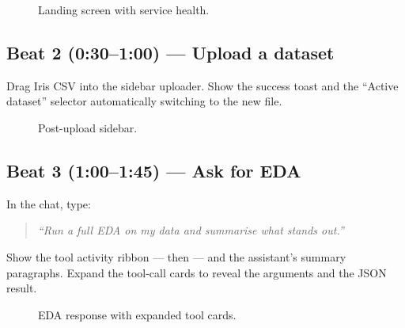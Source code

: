 \begin{figure}[H]
\centering
{}
\caption{Landing screen with service health.}
\label{fig:demo-1}
\end{figure}

\subsection*{Beat 2 (0:30--1:00) --- Upload a dataset}
Drag Iris CSV into the sidebar uploader. Show the success toast and
the ``Active dataset'' selector automatically switching to the new
file.

\begin{figure}[H]
\centering
{}
\caption{Post-upload sidebar.}
\label{fig:demo-2}
\end{figure}

\subsection*{Beat 3 (1:00--1:45) --- Ask for EDA}
In the chat, type:
\begin{quote}
\emph{``Run a full EDA on my data and summarise what stands out.''}
\end{quote}
Show the tool activity ribbon ---  then
 --- and the assistant's summary paragraphs.
Expand the tool-call cards to reveal the arguments and the JSON
result.

\begin{figure}[H]
\centering
{}
\caption{EDA response with expanded tool cards.}
\label{fig:demo-3}
\end{figure}


